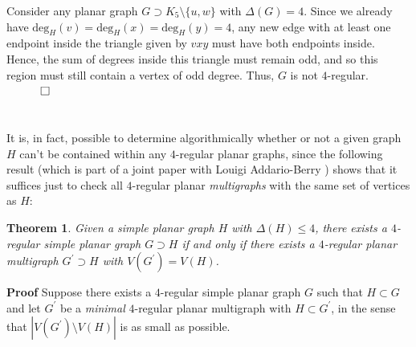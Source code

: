 \documentclass{article}
\newtheorem{Theorem}{Theorem}
\newtheorem{Proof of Theorem}{Proof of Theorem}
\begin{document}
Consider any planar graph $G \supset K_{5} \setminus \{ u,w \}$ with $\Delta (G) = 4$.
Since we already have 
$\textrm{deg}_{H}(v) = \textrm{deg}_{H}(x) = \textrm{deg}_{H}(y) = 4$,
any new edge with at least one endpoint inside the triangle given by $vxy$
must have both endpoints inside.
Hence, the sum of degrees inside this triangle must remain odd,
and so this region must still contain a vertex of odd degree.
Thus, $G$ is not $4$-regular.
$\phantom{qwerty}
\setlength{\unitlength}{.25cm}
\begin{picture}(1,1)
\put(0,0){\line(1,0){1}}
\put(0,0){\line(0,1){1}}
\put(1,1){\line(-1,0){1}}
\put(1,1){\line(0,-1){1}}
\end{picture}$ \\
\\
\\















It is, in fact, possible to determine algorithmically whether or not a given graph $H$
can't be contained within any $4$-regular planar graphs,
since the following result (which is part of a joint paper with Louigi Addario-Berry \cite{add})
shows that it suffices just to check all $4$-regular planar \textit{multigraphs} 
with the same set of vertices as $H$:















\begin{Theorem} \label{bounded991}
Given a simple planar graph $H$ with $\Delta (H) \leq 4$,
there exists a $4$-regular simple planar graph $G \supset H$ 
if and only if there exists a $4$-regular planar multigraph $G^{\prime} \supset H$ 
with $V(G^{\prime}) = V(H)$.
\end{Theorem}
\textbf{Proof}
Suppose there exists a $4$-regular simple planar graph $G$ such that $H \subset G$
and let $G^{\prime}$ be a \textit{minimal} $4$-regular planar multigraph with $H \subset G^{\prime}$,
in the sense that $|V(G^{\prime}) \setminus V(H)|$ is as small as possible.
\end{document}
